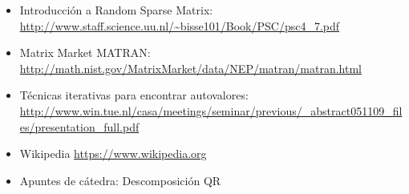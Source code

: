 \documentclass[spanish]{article}
\begin{document}
        \begin{itemize}
    
        \item Introducción a Random Sparse Matrix: \url{http://www.staff.science.uu.nl/~bisse101/Book/PSC/psc4_7.pdf}
        
        \item Matrix Market MATRAN: \url{http://math.nist.gov/MatrixMarket/data/NEP/matran/matran.html}
        
        \item Técnicas iterativas para encontrar autovalores:  \url{http://www.win.tue.nl/casa/meetings/seminar/previous/_abstract051109_files/presentation_full.pdf}
        
        \item Wikipedia \url{https://www.wikipedia.org}
        
        \item Apuntes de cátedra: Descomposición QR
        
        \end{itemize}
    
\end{document}
